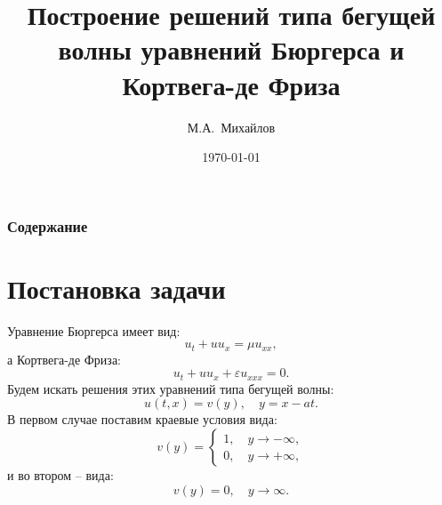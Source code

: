 \documentclass[unicode]{beamer}
\title[Курсовая работа]{Построение решений типа бегущей волны уравнений Бюргерса и Кортвега-де Фриза}
\author[М.А.~Михайлов]{М.А.~Михайлов}
\institute[]{МГТУ им. Н.Э. Баумана}
\date{\today}
\begin{document}
\begin{frame}
\titlepage
\end{frame}

\begin{frame}
\frametitle{Содержание}
\tableofcontents
\end{frame}

\section[Постановка задачи]{Постановка задачи}
Уравнение Бюргерса имеет вид:
\begin{equation} \label{Bur}
u_t+uu_x={\mu}u_{xx},
\end{equation}
а Кортвега-де Фриза:
\begin{equation} \label{Court}
u_t+uu_x+{\varepsilon}u_{xxx}=0.
\end{equation}
Будем искать решения этих уравнений типа бегущей волны:
\begin{equation} \label{WF}
u(t,x)=v(y),\quad y=x-at.
\end{equation}
В первом случае поставим краевые условия вида:
\begin{equation}\label{starteqB}
v(y) = 
 \begin{cases}
   1,\quad y\to-{\infty}, \\
   0,\quad y\to+{\infty},
 \end{cases}
\end{equation}
и во втором -- вида:
\begin{equation} \label{starteqC}
v(y) = 0,\quad y\to{\infty}.
\end{equation}
\end{document}
